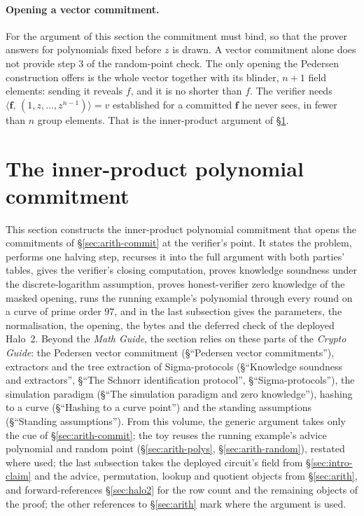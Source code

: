 \documentclass[11pt,a4paper]{article}
\theoremstyle{definition}
\newcommand{\ip}[2]{\langle #1,\, #2 \rangle}
\begin{document}
\paragraph{Opening a vector commitment.}
For the argument of this section the commitment must bind, so that the
prover answers for polynomials fixed before $z$ is drawn. A vector
commitment alone does not provide step 3 of the random-point check. The
only opening the Pedersen construction offers is the whole vector
together with its blinder, $n + 1$ field elements: sending it reveals
$f$, and it is no shorter than $f$. The verifier needs
$\ip{\mathbf f}{(1, z, \dots, z^{n-1})} = v$ established for a committed
$\mathbf f$ he never sees, in fewer than $n$ group elements. That is the
inner-product argument of \S\ref{sec:ipa}.


\section{The inner-product polynomial commitment}
\label{sec:ipa}

This section constructs the inner-product polynomial commitment that
opens the commitments of \S\ref{sec:arith-commit} at the verifier's
point. It states the problem, performs one halving step, recurses it into
the full argument with both parties' tables, gives the verifier's closing
computation, proves knowledge soundness under the discrete-logarithm
assumption, proves honest-verifier zero knowledge of the masked opening,
runs the running example's polynomial through every round on a curve of
prime order $97$, and in the last subsection gives the parameters, the
normalisation, the opening, the bytes and the deferred check of the
deployed Halo~2. Beyond the \emph{Math Guide}, the section relies on
these parts of the \emph{Crypto Guide}: the Pedersen vector commitment
(\S``Pedersen vector commitments''), extractors and the tree extraction
of Sigma-protocols (\S``Knowledge soundness and extractors'', \S``The
Schnorr identification protocol'', \S``Sigma-protocols''), the
simulation paradigm (\S``The simulation paradigm and zero knowledge''),
hashing to a curve (\S``Hashing to a curve point'') and the standing
assumptions (\S``Standing assumptions''). From this volume, the generic
argument takes only the cue of \S\ref{sec:arith-commit}; the toy reuses
the running example's advice polynomial and random point
(\S\ref{sec:arith-polys}, \S\ref{sec:arith-random}), restated where used;
the last subsection takes the deployed circuit's field from
\S\ref{sec:intro-claim} and the advice, permutation, lookup and quotient
objects from \S\ref{sec:arith}, and forward-references \S\ref{sec:halo2}
for the row count and the remaining objects of the proof; the other
references to \S\ref{sec:arith} mark where the argument is used.
\end{document}
